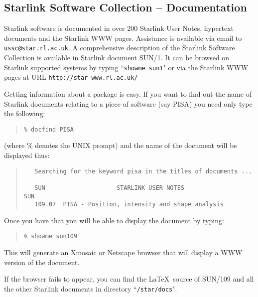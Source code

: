\documentclass[twoside,11pt]{article}
\newcommand{\htmladdnormallink}[2]{#1}
\newcommand{\xref}[3]{#1}
\newcommand{\xlabel}[1]{}
\newcommand{\STARLINKref}{\htmladdnormallink{Starlink}{http://star-www.rl.ac.uk/}}
\newcommand{\PISAref}{\xref{PISA}{sun109}{}}
\newcommand{\PISASUNref}{\xref{SUN/109}{sun109}{}}
\newcommand{\SUNONEref}{\xref{SUN/1}{sun1}{}}
\newcommand{\STARLINKWWWref}{\htmladdnormallink{Starlink WWW}{http://star-www.rl.ac.uk/}}
\newcommand{\HTTPAref}{\htmladdnormallink{\tt http://star-www.rl.ac.uk/}{http://star-www.rl.ac.uk/}}
\begin{document}
\subsection{{\STARLINKref} Software Collection -- Documentation} \xlabel{SSC}
\label{sec:ssc}

{\STARLINKref} software is documented in over 200 Starlink User Notes, hypertext
documents and the {\STARLINKWWWref} pages. Assistance is available
via email to {\tt ussc@star.rl.ac.uk}.
A comprehensive description of the Starlink Software 
Collection is available in Starlink document {\SUNONEref}. It can be 
browsed on Starlink supported systems by typing ``{\tt showme sun1}" or via the 
Starlink WWW pages at URL {\HTTPAref}

Getting information about a package is easy. If you want to find out the 
name of Starlink documents relating to a piece of software (say 
{\PISAref}) you need only type the following:

\begin{quote}
\begin{verbatim}
% docfind PISA
\end{verbatim}
\end{quote}

(where \% denotes the UNIX prompt) and the name of the document 
will be displayed thus:

\begin{quote}
\begin{verbatim}
   Searching for the keyword pisa in the titles of documents ...
 
   SUN                    STARLINK USER NOTES                       SUN
   109.07  PISA - Position, intensity and shape analysis
\end{verbatim}
\end{quote}

Once you have that you will be able to display the document by typing:

\begin{quote}
\begin{verbatim}
% showme sun109
\end{verbatim}
\end{quote}

This will generate an Xmosaic or Netscape browser that will display
a WWW version of the document.

If the browser fails to appear, you can find the \LaTeX\ source of {\PISASUNref}
and all the other Starlink documents in directory ``{\tt /star/docs}".
\end{document}
